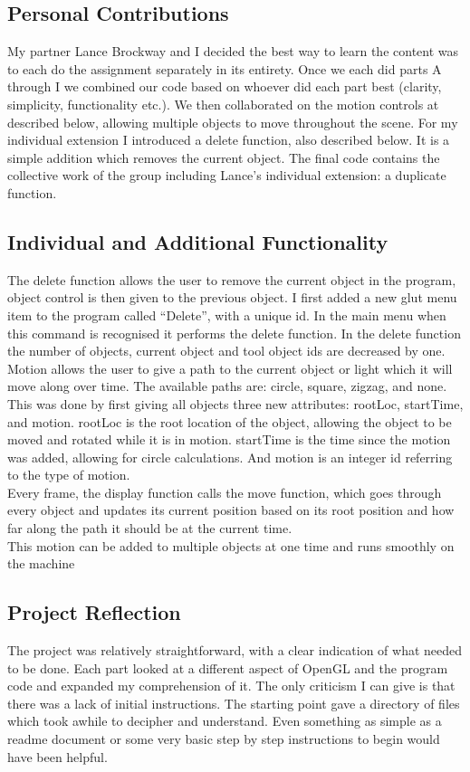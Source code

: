 \documentclass[a4paper, 11pt, titlepage]{article}
\begin{document}
\subsection*{Personal Contributions} 
My partner Lance Brockway and I decided the best way to learn the content was to each do the assignment separately in its entirety. Once we each did parts A through I we combined our code based on whoever did each part best (clarity, simplicity, functionality etc.). We then collaborated on the motion controls at described below, allowing multiple objects to move throughout the scene. For my individual extension I introduced a delete function, also described below. It is a simple addition which removes the current object. The final code contains the collective work of the group including Lance’s individual extension: a duplicate function. 
 
\subsection*{Individual and Additional Functionality} 
The delete function allows the user to remove the current object in the program, object control is then given to the previous object.  I first added a new glut menu item to the program called “Delete”, with a unique id. In the main menu when this command is recognised it performs the delete function. In the delete function the number of objects, current object and tool object ids are decreased by one.\\ 
Motion allows the user to give a path to the current object or light which it will move along over time. The available paths are: circle, square, zigzag, and none. This was done by first giving all objects three new attributes: rootLoc, startTime, and motion. rootLoc is the root location of the object, allowing the object to be moved and rotated while it is in motion. startTime is the time since the motion was added, allowing for circle calculations. And motion is an integer id referring to the type of motion.\\ 
Every frame, the display function calls the move function, which goes through every object and updates its current position based on its root position and how far along the path it should be at the current time. \\ 
This motion can be added to multiple objects at one time and runs smoothly on the machine 
 
\subsection*{Project Reflection} 
The project was relatively straightforward, with a clear indication of what needed to be done. Each part looked at a different aspect of OpenGL and the program code and expanded my comprehension of it. The only criticism I can give is that there was a lack of initial instructions. The starting point gave a directory of files which took awhile to decipher and understand. Even something as simple as a readme document or some very basic step by step instructions to begin would have been helpful. 
 
\end{document}
